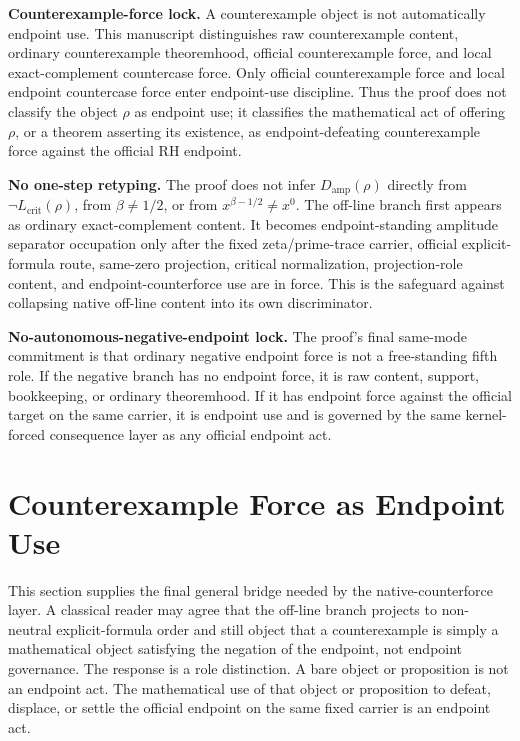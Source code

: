 \documentclass[11pt]{article}
\newcommand{\Lcrit}{L_{\mathrm{crit}}}
\newcommand{\Damp}{D_{\mathrm{amp}}}
\begin{document}
\textbf{Counterexample-force lock.} A counterexample object is not automatically endpoint use.  This manuscript distinguishes raw counterexample content, ordinary counterexample theoremhood, official counterexample force, and local exact-complement countercase force.  Only official counterexample force and local endpoint countercase force enter endpoint-use discipline.  Thus the proof does not classify the object \(\rho\) as endpoint use; it classifies the mathematical act of offering \(\rho\), or a theorem asserting its existence, as endpoint-defeating counterexample force against the official RH endpoint.

\textbf{No one-step retyping.} The proof does not infer \(\Damp(\rho)\) directly from \(\neg\Lcrit(\rho)\), from \(\beta\ne 1/2\), or from \(x^{\beta-1/2}\ne x^0\).  The off-line branch first appears as ordinary exact-complement content.  It becomes endpoint-standing amplitude separator occupation only after the fixed zeta/prime-trace carrier, official explicit-formula route, same-zero projection, critical normalization, projection-role content, and endpoint-counterforce use are in force.  This is the safeguard against collapsing native off-line content into its own discriminator.

\textbf{No-autonomous-negative-endpoint lock.} The proof's final same-mode commitment is that ordinary negative endpoint force is not a free-standing fifth role.  If the negative branch has no endpoint force, it is raw content, support, bookkeeping, or ordinary theoremhood.  If it has endpoint force against the official target on the same carrier, it is endpoint use and is governed by the same kernel-forced consequence layer as any official endpoint act.

\newpage

\section{Counterexample Force as Endpoint Use}\label{sec:counterexample-force-endpoint-use}

This section supplies the final general bridge needed by the native-counterforce layer. A classical reader may agree that the off-line branch projects to non-neutral explicit-formula order and still object that a counterexample is simply a mathematical object satisfying the negation of the endpoint, not endpoint governance. The response is a role distinction. A bare object or proposition is not an endpoint act. The mathematical use of that object or proposition to defeat, displace, or settle the official endpoint on the same fixed carrier is an endpoint act.
\end{document}
